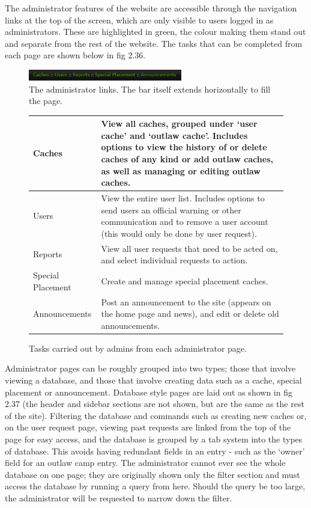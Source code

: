 The administrator features of the website are accessible through the navigation links at the top of the screen, which are only visible to users logged in as administrators. These are highlighted in green, the colour making them stand out and separate from the rest of the website. The tasks that can be completed from each page are shown below in fig 2.36. 
\vspace{55pt}
\begin{figure}[ht]
	\begin{center}
	\includegraphics[width=0.6\textwidth]{images/admin_bar}
	\caption{The administrator links. The bar itself extends horizontally to fill the page.}
	\label{admin_bar}
	\end{center}
\end{figure}
\begin{figure}[ht]
\begin{center}
\begin{tabular}{| p{} | p{} |}
	\hline
	Caches &
	View all caches, grouped under `user cache' and `outlaw cache'. Includes options to view the history of or delete caches of any kind or add outlaw caches, as well as managing or editing outlaw caches. \\
	\hline
	Users &
	View the entire user list. Includes options to send users an official warning or other communication and to remove a user account (this would only be done by user request). \\
	\hline
	Reports &
	View all user requests that need to be acted on, and select individual requests to action. \\
	\hline
	Special Placement &
	Create and manage special placement caches. \\
	\hline
	Announcements &
	Post an announcement to the site (appears on the home page and news), and edit or delete old announcements. \\
	\hline
\end{tabular}
\caption {Tasks carried out by admins from each administrator page.}
\label{admin_page_tasks}
\end{center}
\end{figure}


Administrator pages can be roughly grouped into two types; those that involve viewing a database, and those that involve creating data such as a cache, special placement or announcement. Database style pages are laid out as shown in fig 2.37 (the header and sidebar sections are not shown, but are the same as the rest of the site). Filtering the database and commands such as creating new caches or, on the user request page, viewing past requests are linked from the top of the page for easy access, and the database is grouped by a tab system into the types of database. This avoids having redundant fields in an entry - such as the `owner' field for an outlaw camp entry. The administrator cannot ever see the whole database on one page; they are originally shown only the filter section and must access the database by running a query from here. Should the query be too large, the administrator will be requested to narrow down the filter.

